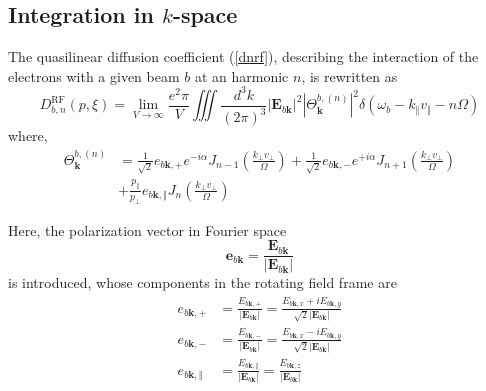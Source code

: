 
\label{RFdiff}\subsection{Integration in $k$-space}

The quasilinear diffusion coefficient (\ref{dnrf}), describing the interaction
of the electrons with a given beam $b$ at an harmonic $n$, is rewritten as
\begin{equation}
D_{b,n}^{\text{RF}}(p,\xi)=\lim_{V\rightarrow\infty}\frac{e^{2}\pi}{V}%
\iiint\frac{d^{3}k}{(2\pi)^{3}}\left|  \mathbf{E}_{b\mathbf{k}}\right|
^{2}\left|  \Theta_{\mathbf{k}}^{b,\left(  n\right)  }\right|  ^{2}%
\delta\left(  \omega_{b}-k_{\Vert}v_{\Vert}-n\Omega\right)  \label{dn}%
\end{equation}
where,
\begin{align}
\Theta_{\mathbf{k}}^{b,\left(  n\right)  }&=\frac{1}{\sqrt{2}}e_{b\mathbf{k}%
,+}e^{-i\alpha}J_{n-1}\left(
\frac{k_{\bot}v_{\bot}}{\Omega}\right)
+\frac{1}{\sqrt{2}}e_{b\mathbf{k},-}e^{+i\alpha}J_{n+1}\left(
\frac{k_{\bot }v_{\bot}}{\Omega}\right)\nonumber\\&
+\frac{p_{\Vert}}{p_{\bot}}e_{b\mathbf{k},\Vert
}J_{n}\left(  \frac{k_{\bot}v_{\bot}}{\Omega}\right)  \label{thetak}%
\end{align}

Here, the polarization vector in Fourier space
\begin{equation}
\mathbf{e}_{b\mathbf{k}}=\frac{\mathbf{E}_{b\mathbf{k}}}{\left|
\mathbf{E}_{b\mathbf{k}}\right|  } \label{polvec}%
\end{equation}
is introduced, whose components in the rotating field frame are
\begin{align}
e_{b\mathbf{k},+}  &  =\frac{E_{b\mathbf{k},+}}{\left|  \mathbf{E}%
_{b\mathbf{k}}\right|  }=\frac{E_{b\mathbf{k},x}+iE_{b\mathbf{k},y}}{\sqrt
{2}\left|  \mathbf{E}_{b\mathbf{k}}\right|  }\label{pol}\\
e_{b\mathbf{k},-}  &  =\frac{E_{b\mathbf{k},-}}{\left|  \mathbf{E}%
_{b\mathbf{k}}\right|  }=\frac{E_{b\mathbf{k},x}-iE_{b\mathbf{k},y}}{\sqrt
{2}\left|  \mathbf{E}_{b\mathbf{k}}\right|  }\nonumber\\
e_{b\mathbf{k},\Vert}  &  =\frac{E_{b\mathbf{k},\Vert}}{\left|  \mathbf{E}%
_{b\mathbf{k}}\right|  }=\frac{E_{b\mathbf{k},z}}{\left|  \mathbf{E}%
_{b\mathbf{k}}\right|  }\nonumber
\end{align}

